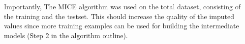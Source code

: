 Importantly, The MICE algorithm was used on the total dataset, consisting of the
training and the testset. This should increase
the quality of the imputed values since more training examples can be
used for building the intermediate models (Step 2 in the algorithm
outline).